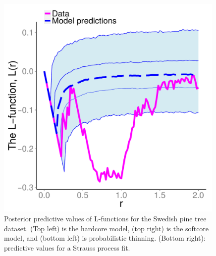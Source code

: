 \documentclass{statsoc}
\begin{document}
  \begin{figure}
  \begin{minipage}[h]{0.22\linewidth}
  \caption[Post Pred]{Posterior predictive values of L-functions for the Swedish pine tree dataset. (Top left) is the \matern hardcore model,
  (top right) is the softcore model, and (bottom left) is probabilistic thinning. (Bottom right): predictive values for a Strauss process fit.}
  \label{fig:swed_L_pred}
  \end{minipage}
  \ \ \ 
  \begin{minipage}[h]{0.6\linewidth}
  \begin{minipage}[h]{0.49\linewidth}
  \centering
  \includegraphics[width=0.99\textwidth]{figs/Jfunc_postpred_R10/swed_hc_Lfunc.pdf}
  \end{minipage}
  \begin{minipage}[h]{0.49\linewidth}
  \centering

\end{minipage}
\end{minipage}
\end{figure}
\end{document}
